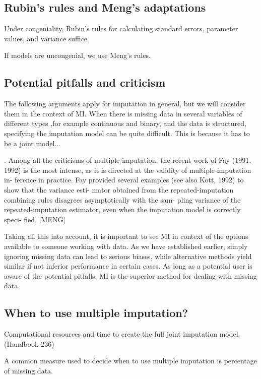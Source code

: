 \documentclass{article}
\begin{document}
	\subsection{Rubin's rules and Meng's adaptations}
	
	Under congeniality, Rubin's rules for calculating standard errors, parameter values, and variance suffice.
	
	If models are uncongenial, we use Meng's rules.
	
	\subsection{Potential pitfalls and criticism}
	The following arguments apply for imputation in general, but we will consider them in the context of MI. When there is missing data in several variables of different types ,for example continuous and binary, and the data is structured, specifying the imputation model can be quite difficult. This is because it has to be a joint model...
	
	
	. Among all the
	criticisms of multiple imputation, the recent work
	of Fay (1991, 1992) is the most intense, as it is
	directed at the validity of multiple-imputation in-
	ference in practice. Fay provided several examples
	(see also Kott, 1992) to show that the variance esti-
	mator obtained from the repeated-imputation combining rules disagrees asymptotically with the sam-
	pling variance of the repeated-imputation estimator,
	even when the imputation model is correctly speci-
	fied. [MENG]
	
	
	Taking all this into account, it is important to see MI in context of the options available to someone working with data. As we have established earlier, simply ignoring missing data can lead  to serious biases, while alternative methods yield similar if not inferior performance in certain cases. As long as a potential user is aware of the potential pitfalls, MI is the superior method for dealing with missing data.
	
	
	\subsection{When to use multiple imputation?}
	Computational resources and time to create the full joint imputation model. (Handbook 236)
	
	A common measure used to decide when to use multiple imputation is percentage of missing data.
	
\end{document}
